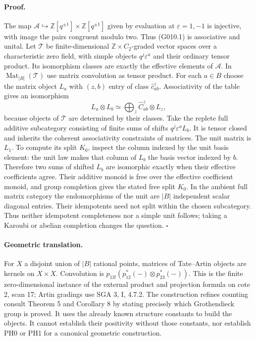 \paragraph{Proof.}
The map $\mathcal A\hookrightarrow
\mathbb Z[q^{\pm1}]\times\mathbb Z[q^{\pm1}]$ given by
evaluation at $\varepsilon=1,-1$ is injective, with image the
pairs congruent modulo two. Thus (G010.1) is associative and
unital. Let $\mathcal T$ be finite-dimensional
$\mathbb Z\times C_2$-graded vector spaces over a characteristic
zero field, with simple objects $q^j\varepsilon^a$ and their
ordinary tensor product. Its isomorphism classes are exactly
the effective elements of $\mathcal A$.
In $\operatorname{Mat}_{|B|}(\mathcal T)$ use matrix convolution
as tensor product. For each $a\in B$ choose the matrix object
$L_a$ with $(z,b)$ entry of class $\widehat c_{ab}^z$.
Associativity of the table gives an isomorphism
\[
 L_a\otimes L_b\simeq\bigoplus_z
        \widehat C_{ab}^z\otimes L_z,
\]
because objects of $\mathcal T$ are determined by their classes.
Take the replete full additive subcategory consisting of finite
sums of shifts $q^j\varepsilon^aL_b$. It is tensor closed and
inherits the coherent associativity constraints of matrices.
The unit matrix is $L_1$.
To compute its split $K_0$, inspect the column indexed by the
unit basis element: the unit law makes that column of $L_b$
the basis vector indexed by $b$. Therefore two sums of shifted
$L_b$ are isomorphic exactly when their effective coefficients
agree. Their additive monoid is free over the effective
coefficient monoid, and group completion gives the stated
free split $K_0$.
In the ambient full matrix category the endomorphisms of the
unit are $|B|$ independent scalar diagonal entries. Their
idempotents need not split within the chosen subcategory.
Thus neither idempotent completeness nor a simple unit follows;
taking a Karoubi or abelian completion changes the question.
\hfill$\square$

\paragraph{Geometric translation.}
For $X$ a disjoint union of $|B|$ rational points, matrices of
Tate--Artin objects are kernels on $X\times X$. Convolution is
$p_{13!}(p_{12}^*(-)\otimes p_{23}^*(-))$. This is the finite
zero-dimensional instance of the external product and projection
formula on cote 2, scan 17; Artin gradings use SGA 3, I, 4.7.2.
The construction refines counting consult Theorem 5 and
Corollary 8 by stating precisely which Grothendieck group is
proved. It uses the already known structure constants to build
the objects. It cannot establish their positivity without those
constants, nor establish PH0 or PH1 for a canonical geometric
construction.

